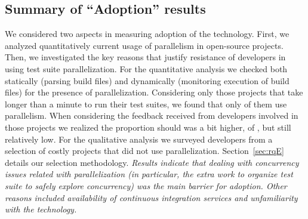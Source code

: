 \subsection{Summary of ``Adoption'' results}

We considered two aspects in measuring adoption of the technology.
First, we analyzed quantitatively current usage of parallelism in
open-source projects.  Then, we investigated the key reasons that
justify resistance of developers in using test suite parallelization.
For the quantitative analysis we checked both statically (parsing
build files) and dynamically (monitoring execution of build files) for
the presence of parallelization.  Considering only those projects that
take longer than a minute to run their test suites, we found that only
\percentParallel{} of them use parallelism.  When considering the
feedback received from developers involved in those projects we
realized the proportion should was a bit higher, of
\percentParallelUpdated{}, but still relatively low.  For the
qualitative analysis we surveyed developers from a selection of costly
projects that did not use parallelization.  Section~\ref{sec:rqE}
details our selection methodology. \emph{Results indicate that dealing
  with concurrency issues related with parallelization (in particular,
  the extra work to organize test suite to safely explore concurrency)
  was the main barrier for adoption.  Other reasons included
  availability of continuous integration services and unfamiliarity
  with the technology.}


